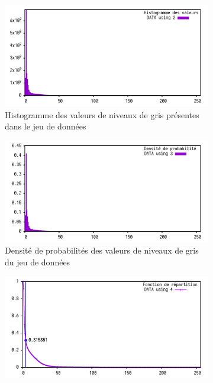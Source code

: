 {{        \begin{figure}[H]
            \centering
            \begin{subfigure}{.8\linewidth}
                \centering
                \includegraphics[width=\linewidth]{img/stats/histo.png}
                \caption{Histogramme des valeurs de niveaux de gris présentes dans le jeu de données}
                \label{img:prostate:stats:histogram}
            \end{subfigure}
            \begin{subfigure}{.8\linewidth}
                \centering
                \includegraphics[width=\linewidth]{img/stats/distrib.png}
                \caption{Densité de probabilités des valeurs de niveaux de gris du jeu de données}
                \label{img:prostate:stats:ddp}
            \end{subfigure}
            \begin{subfigure}{.8\linewidth}
                \centering
                \includegraphics[width=\linewidth]{img/stats/proba.png}

\end{subfigure}
\end{figure}}}
